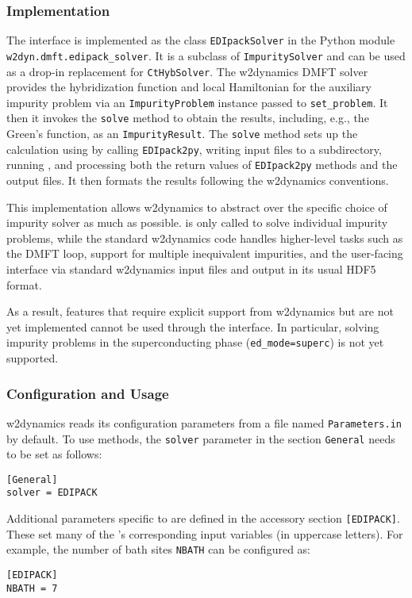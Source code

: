 \documentclass[edipack_sp.tex]{subfiles}
\begin{document}
\subsubsection{Implementation}\label{sSecInteropw2dyNPrereq}
The \NAME interface is implemented as the class \texttt{EDIpackSolver} 
in the Python module \texttt{w2dyn.dmft.edipack\_solver}. It is a subclass of 
\texttt{ImpuritySolver} and can be used as a drop-in replacement for 
\texttt{CtHybSolver}. The w2dynamics DMFT solver provides the hybridization 
function and local Hamiltonian for the auxiliary impurity problem via 
an \texttt{ImpurityProblem} instance passed to \texttt{set\_problem}. It then 
it invokes the \texttt{solve} method to obtain the results, including, 
e.g., the Green's function, as an \texttt{ImpurityResult}.
%
The \texttt{solve} method sets up the calculation using \NAME by calling 
\texttt{EDIpack2py}, writing input files to a subdirectory, running 
\NAME, and processing both the return values of \texttt{EDIpack2py} 
methods and the output files. It then formats the results following the w2dynamics conventions.



This implementation allows w2dynamics to abstract over the specific 
choice of impurity solver as much as possible. \NAME is only called 
to solve individual impurity problems, while the standard w2dynamics 
code handles higher-level tasks such as the DMFT loop, support for 
multiple inequivalent impurities, and the user-facing interface via 
standard w2dynamics input files and output in its usual HDF5 format.

As a result, features that require explicit support from w2dynamics 
but are not yet implemented cannot be used through the \NAME interface. 
In particular, solving impurity problems in the superconducting phase 
(\texttt{ed\_mode=superc}) is not yet  supported.


\subsubsection{Configuration and Usage}\label{sSecInteropw2dyNConfig}
w2dynamics reads its configuration parameters from a file named \texttt{Parameters.in} by default. To use \NAME methods, the {\tt solver} parameter in the section {\tt General} needs to be set as follows:
\begin{lstlisting}[style=mybash]
[General]
solver = EDIPACK
\end{lstlisting}
Additional parameters specific to \NAME are defined in the accessory section \texttt{[EDIPACK]}. These set many of the \NAME's corresponding input variables (in  uppercase letters). For example,  the number of bath sites {\tt NBATH} can be configured as:
\begin{lstlisting}[style=mybash]
[EDIPACK]
NBATH = 7
\end{lstlisting}
\end{document}
